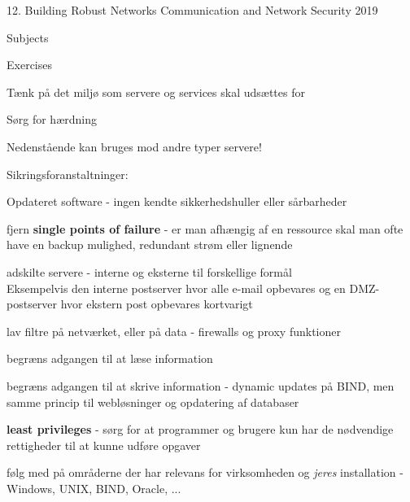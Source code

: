 \documentclass[Screen16to9,17pt]{foils}
\begin{document}
\mytitlepage
{12. Building Robust Networks}
{Communication and Network Security 2019}



\begin{list1}
\item Subjects
\begin{list2}
\item
\end{list2}
\item Exercises
\begin{list2}
\item
\end{list2}
\end{list1}



\begin{list1}
\item Tænk på det miljø som servere og services skal udsættes for
\item Sørg for hærdning
\end{list1}

\begin{list1}
  \item Nedenstående kan bruges mod andre typer servere!
\item Sikringsforanstaltninger:
  \begin{list2}
  \item Opdateret software - ingen kendte sikkerhedshuller eller
  sårbarheder
\item fjern {\bfseries single points of failure} - er man afhængig af
  en ressource skal man ofte have en backup mulighed, redundant strøm
  eller lignende
\item adskilte servere - interne og eksterne til forskellige formål\\
Eksempelvis den interne postserver hvor alle e-mail opbevares og en
DMZ-postserver hvor ekstern post opbevares kortvarigt
\item lav filtre på netværket, eller på data - firewalls og proxy
  funktioner
\item begræns adgangen til at læse information
\item begræns adgangen til at skrive information - dynamic updates på
  BIND, men samme princip til webløsninger og opdatering af databaser
\item {\bfseries least privileges} - sørg for at programmer og brugere
  kun har de nødvendige rettigheder til at kunne udføre opgaver
\item følg med på områderne der har relevans for virksomheden og
  \emph{jeres} installation - Windows, UNIX, BIND, Oracle, ...
  \end{list2}
\end{list1}
\end{document}
